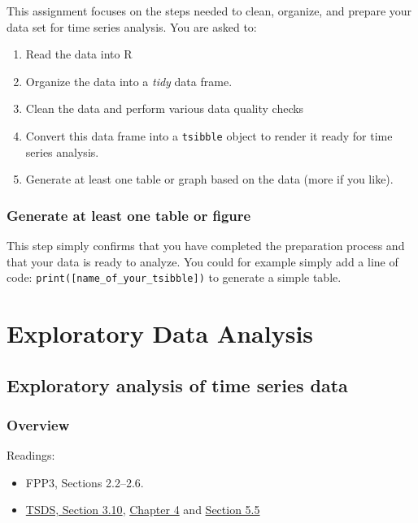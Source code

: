 \documentclass[
]{book}
\providecommand{\tightlist}{%
  \setlength{\itemsep}{0pt}\setlength{\parskip}{0pt}}
\begin{document}
This assignment focuses on the steps needed to clean, organize, and prepare your data set for time series analysis. You are asked to:

\begin{enumerate}
\def\labelenumi{\arabic{enumi}.}
\tightlist
\item
  Read the data into R
\item
  Organize the data into a \emph{tidy} data frame.
\item
  Clean the data and perform various data quality checks
\item
  Convert this data frame into a \texttt{tsibble} object to render it ready for time series analysis.
\item
  Generate at least one table or graph based on the data (more if you like).
\end{enumerate}

\hypertarget{generate-at-least-one-table-or-figure}{%
\section{Generate at least one table or figure}\label{generate-at-least-one-table-or-figure}}

This step simply confirms that you have completed the preparation process and that your data is ready to analyze. You could for example simply add a line of code: \texttt{print({[}name\_of\_your\_tsibble{]})} to generate a simple table.

\hypertarget{part-exploratory-data-analysis}{%
\part{Exploratory Data Analysis}\label{part-exploratory-data-analysis}}

\hypertarget{exploratory-analysis-of-time-series-data}{%
\chapter{Exploratory analysis of time series data}\label{exploratory-analysis-of-time-series-data}}

\hypertarget{overview}{%
\section{Overview}\label{overview}}

Readings:

\begin{itemize}
\tightlist
\item
  FPP3, Sections 2.2--2.6.
\item
  \href{https://jhudatascience.org/tidyversecourse/wrangle-data.html\#exploratory-data-analysis}{TSDS, Section 3.10}, \href{https://jhudatascience.org/tidyversecourse/dataviz.html}{Chapter 4} and \href{https://jhudatascience.org/tidyversecourse/model.html\#descriptive-and-exploratory-analysis}{Section 5.5}
\end{itemize}
\end{document}
